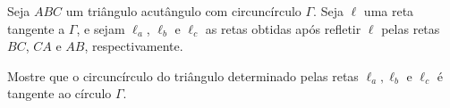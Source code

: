 Seja $ABC$ um triângulo acutângulo com circuncírculo $\Gamma$. Seja $\ell$ uma reta tangente a $\Gamma$, e sejam $\ell_a$, $\ell_b$ e $\ell_c$ as retas obtidas após refletir $\ell$ pelas retas $BC$,  $CA$ e $AB$,  respectivamente.

Mostre que o circuncírculo do triângulo determinado pelas retas $\ell_a, \ell_b$ e $\ell_c$ é tangente ao círculo $\Gamma$.

